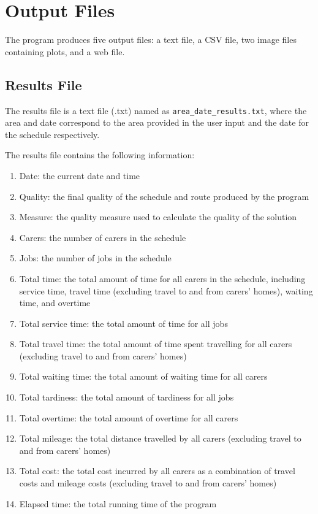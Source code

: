 \documentclass[a4paper]{article}
\begin{document}
\section{Output Files}
The program produces five output files: a text file, a CSV file, two image files containing plots, and a web file.
\subsection{Results File}
The results file is a text file (.txt) named as \texttt{area\_date\_results.txt}, where the area and date correspond to the area provided in the user input and the date for the schedule respectively.

The results file contains the following information:
\begin{enumerate}
	\item Date: the current date and time
	\item Quality: the final quality of the schedule and route produced by the program
	\item Measure: the quality measure used to calculate the quality of the solution
	\item Carers: the number of carers in the schedule
	\item Jobs: the number of jobs in the schedule
	\item Total time: the total amount of time for all carers in the schedule, including service time, travel time (excluding travel to and from carers' homes), waiting time, and overtime
	\item Total service time: the total amount of time for all jobs
	\item Total travel time: the total amount of time spent travelling for all carers (excluding travel to and from carers' homes)
	\item Total waiting time: the total amount of waiting time for all carers
	\item Total tardiness: the total amount of tardiness for all jobs
	\item Total overtime: the total amount of overtime for all carers
	\item Total mileage: the total distance travelled by all carers (excluding travel to and from carers' homes)
	\item Total cost: the total cost incurred by all carers as a combination of travel costs and mileage costs (excluding travel to and from carers' homes)
	\item Elapsed time: the total running time of the program
\end{enumerate}
\end{document}
